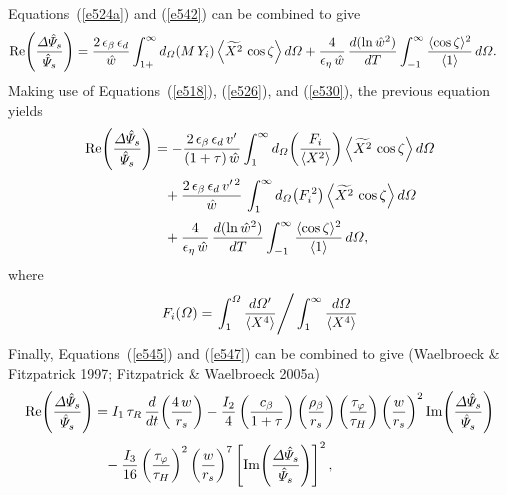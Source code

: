 \documentclass[notitlepage,12pt]{article}
\begin{document}
Equations~(\ref{e524a}) and (\ref{e542}) can be combined to give
\begin{align}
{\rm Re}\!\left(\frac{{\mit\Delta}\hat{\mit\Psi}_s}{\hat{\mit\Psi}_s}\right)&= \frac{2\,\epsilon_\beta\,\epsilon_d}{\hat{w}}
\int_{1+}^\infty d_{\mit\Omega}(M\,Y_i)\left\langle\widetilde{X^2}\,\cos\zeta\right\rangle d{\mit\Omega}
+\frac{4}{\epsilon_\eta\,\hat{w}}\,\frac{d(\ln \hat{w}^2)}{dT}\int_{-1}^\infty \frac{\langle \cos\zeta\rangle^2}{\langle 1\rangle}\,d{\mit\Omega}.
\end{align}
Making use of Equations~(\ref{e518}), (\ref{e526}), and (\ref{e530}), the previous equation yields
\begin{align}
{\rm Re}\!\left(\frac{{\mit\Delta}\hat{\mit\Psi}_s}{\hat{\mit\Psi}_s}\right)&= -\frac{2\,\epsilon_\beta\,\epsilon_d\,v'}{(1+\tau)\,\hat{w}}
\int_1^\infty d_{\mit\Omega}\!\left(\frac{F_i}{\langle X^2\rangle}\right)\left\langle\widetilde{X^2}\,\cos\zeta\right\rangle d{\mit\Omega}
\nonumber\\[0.5ex]
&\phantom{=}+ \frac{2\,\epsilon_\beta\,\epsilon_d\,v'^{\,2}}{\hat{w}} \,\int_1^\infty d_{\mit\Omega}\!\left(F_i^{\,2}\right)\left\langle\widetilde{X^2}\,\cos\zeta\right\rangle d{\mit\Omega}\nonumber\\[0.5ex]
&\phantom{=}+\frac{4}{\epsilon_\eta\,\hat{w}}\,\frac{d(\ln \hat{w}^2)}{dT}\int_{-1}^\infty \frac{\langle \cos\zeta\rangle^2}{\langle 1\rangle}\,d{\mit\Omega},\label{e547}
\end{align}
where
\begin{equation}
F_i({\mit\Omega})=\left.\int_1^{\mit\Omega}\frac{d{\mit\Omega}'}{\langle X^4\rangle}\right/\int_1^\infty\frac{d{\mit\Omega}}{\langle X^4\rangle}
\end{equation}
Finally, Equations~(\ref{e545}) and (\ref{e547})
can be combined to give (Waelbroeck \& Fitzpatrick 1997; Fitzpatrick \& Waelbroeck 2005a)
\begin{align}\label{e559}
{\rm Re}\!\left(\frac{{\mit\Delta}\hat{\mit\Psi}_s}{\hat{\mit\Psi}_s}\right)&= I_1\,\tau_R\,\frac{d}{dt}\!\left(\frac{4\,w}{r_s}\right)
- \frac{I_2}{4}\left(\frac{c_\beta}{1+\tau}\right)\left(\frac{\rho_\beta}{r_s}\right)\left(\frac{\tau_\varphi}{\tau_H}\right)\left(\frac{w}{r_s}\right)^2 {\rm Im}\!\left(\frac{{\mit\Delta}\hat{\mit\Psi}_s}{\hat{\mit\Psi}_s}\right)\nonumber\\[0.5ex]
&\phantom{=} -\frac{I_3}{16}\left(\frac{\tau_\varphi}{\tau_H}\right)^2 \left(\frac{w}{r_s}\right)^7\left[{\rm Im}\!\left(\frac{{\mit\Delta}\hat{\mit\Psi}_s}{\hat{\mit\Psi}_s}\right)\right]^2, 
\end{align}
\end{document}
